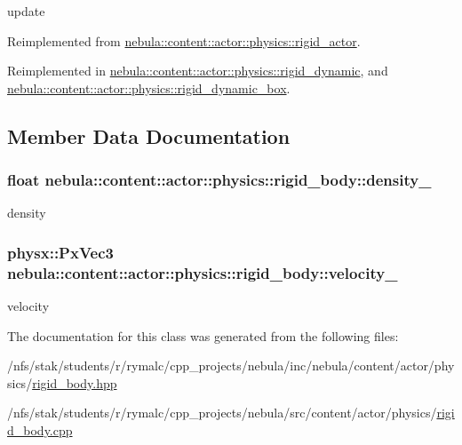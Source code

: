 update 

Reimplemented from \hyperlink{classnebula_1_1content_1_1actor_1_1physics_1_1rigid__actor_a9227091110aae435ca13493edd27fe66}{nebula::content::actor::physics::rigid\_\-actor}.

Reimplemented in \hyperlink{classnebula_1_1content_1_1actor_1_1physics_1_1rigid__dynamic_a37baf9ed4986782294789073ebb05f19}{nebula::content::actor::physics::rigid\_\-dynamic}, and \hyperlink{classnebula_1_1content_1_1actor_1_1physics_1_1rigid__dynamic__box_ac3f90a5c975d090930fb77f5961e7064}{nebula::content::actor::physics::rigid\_\-dynamic\_\-box}.

\subsection{Member Data Documentation}
\hypertarget{classnebula_1_1content_1_1actor_1_1physics_1_1rigid__body_a2d5df055b3d881f8ce87cf078261c142}{
\subsubsection[{density\_\-}]{\setlength{\rightskip}{0pt plus 5cm}float {\bf nebula::content::actor::physics::rigid\_\-body::density\_\-}}}
\label{classnebula_1_1content_1_1actor_1_1physics_1_1rigid__body_a2d5df055b3d881f8ce87cf078261c142}


density \hypertarget{classnebula_1_1content_1_1actor_1_1physics_1_1rigid__body_abefc32c16035c731bcdfaa4deedbfb78}{
\subsubsection[{velocity\_\-}]{\setlength{\rightskip}{0pt plus 5cm}physx::PxVec3 {\bf nebula::content::actor::physics::rigid\_\-body::velocity\_\-}}}
\label{classnebula_1_1content_1_1actor_1_1physics_1_1rigid__body_abefc32c16035c731bcdfaa4deedbfb78}


velocity 

The documentation for this class was generated from the following files:\begin{DoxyCompactItemize}
\item 
/nfs/stak/students/r/rymalc/cpp\_\-projects/nebula/inc/nebula/content/actor/physics/\hyperlink{physics_2rigid__body_8hpp}{rigid\_\-body.hpp}\item 
/nfs/stak/students/r/rymalc/cpp\_\-projects/nebula/src/content/actor/physics/\hyperlink{physics_2rigid__body_8cpp}{rigid\_\-body.cpp}\end{DoxyCompactItemize}
